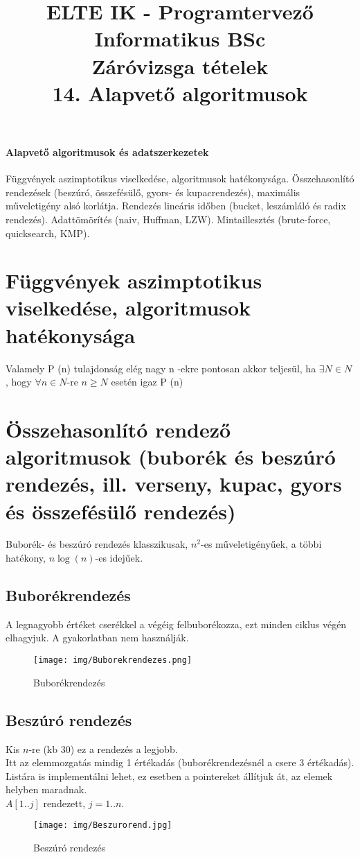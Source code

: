\documentclass[margin=0px]{article}
\title{\textbf{{\Large ELTE IK - Programtervező Informatikus BSc} \vspace{0.2cm} \\ {\huge Záróvizsga tételek}} \vspace{0.3cm} \\ 14. Alapvető algoritmusok}
\author{}
\date{}
\newenvironment{tetel}[1]{\paragraph{#1 \\}}{}
\begin{document}
\maketitle

\begin{tetel}{Alapvető algoritmusok és adatszerkezetek}
    Függvények aszimptotikus viselkedése, algoritmusok hatékonysága. Összehasonlító rendezések (beszúró, összefésülő, gyors- és kupacrendezés), maximális műveletigény alsó korlátja. Rendezés lineáris időben (bucket, leszámláló és radix rendezés). Adattömörítés (naiv, Huffman, LZW). Mintaillesztés (brute-force, quicksearch, KMP).
\end{tetel}

\section{Függvények aszimptotikus viselkedése, algoritmusok hatékonysága}

Valamely P (n) tulajdonság elég nagy n -ekre pontosan akkor teljesül, ha $\exists N \in N$, hogy $\forall n \in N$-re $n \geq N$ esetén igaz P (n)

\section{Összehasonlító rendező algoritmusok (buborék és beszúró rendezés, ill. verseny, kupac, gyors és összefésülő rendezés)}

Buborék- és beszúró rendezés klasszikusak, $n^2$-es műveletigényűek, a többi hatékony, $n\log(n)$-es idejűek.

\subsection{Buborékrendezés}

A legnagyobb értéket cserékkel a végéig felbuborékozza, ezt minden ciklus végén elhagyjuk. A gyakorlatban nem használják.
\begin{figure}[H]
    \centering
    \texttt{[image: img/Buborekrendezes.png]}
    \caption{Buborékrendezés}
\end{figure}

\subsection{Beszúró rendezés}

Kis $n$-re (kb 30) ez a rendezés a legjobb. \\
Itt az elemmozgatás mindig 1 értékadás (buborékrendezésnél a csere 3 értékadás). Listára is implementálni lehet, ez esetben a pointereket állítjuk át, az elemek helyben maradnak. \\
$A[1..j]$ rendezett, $j=1..n$.
\begin{figure}[H]
    \centering
    \texttt{[image: img/Beszurorend.jpg]}
    \caption{Beszúró rendezés}
\end{figure}
\end{document}
